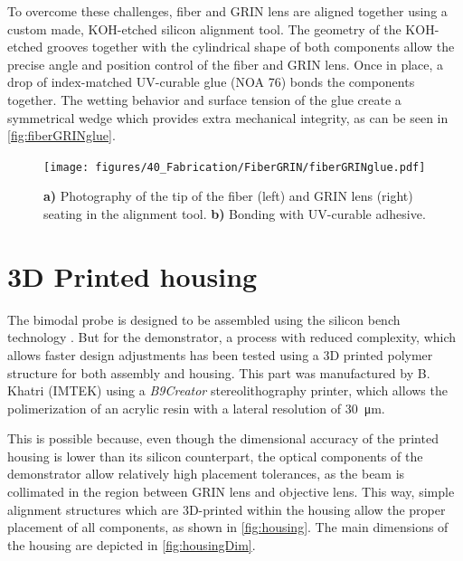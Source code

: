 To overcome these challenges, fiber and GRIN lens are aligned together using a custom made, KOH-etched silicon alignment tool. The geometry of the KOH-etched grooves together with the cylindrical shape of both components allow the precise angle and position control of the fiber and GRIN lens. Once in place, a drop of index-matched UV-curable glue (NOA 76) bonds the components together. The wetting behavior and surface tension of the glue create a symmetrical wedge which provides extra mechanical integrity, as can be seen in \autoref{fig:fiberGRINglue}.

\begin{figure}[h!]\centering \texttt{[image: figures/40\_Fabrication/FiberGRIN/fiberGRINglue.pdf]}
      \caption{\textbf{a)} Photography of the tip of the fiber (left) and GRIN lens (right) seating in the alignment tool.
      \textbf{b)} Bonding with UV-curable adhesive.}
      \label{fig:fiberGRINglue}
\end{figure}




\section{3D Printed housing}

The bimodal probe is designed to be assembled using the silicon bench technology \cite{Kretschmer}. But for the demonstrator, a process with reduced complexity, which allows faster design adjustments has been tested using a 3D printed polymer structure for both assembly and housing. This part was manufactured by B. Khatri (IMTEK) using a \textit{B9Creator} stereolithography printer, which allows the polimerization of an acrylic resin with a lateral resolution of \SI{30}{\micro\meter}.

This is possible because, even though the dimensional accuracy of the printed housing is lower than its silicon counterpart, the optical components of the demonstrator allow relatively high placement tolerances, as the beam is collimated in the region between GRIN lens and objective lens. This way, simple alignment structures which are 3D-printed within the housing allow the proper placement of all components, as shown in \autoref{fig:housing}. The main dimensions of the housing are depicted in \autoref{fig:housingDim}.

